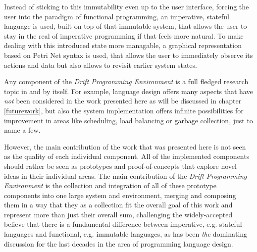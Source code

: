 Instead of sticking to this immutability even up to the user interface,
forcing the user into the paradigm of functional programming, an
imperative, stateful language is used, built on top of that immutable
system, that allows the user to stay in the real of imperative
programming if that feels more natural. To make dealing with this
introduced state more managable, a graphical representation based
on Petri Net syntax is used, that allows the user to immediately
observe its actions and data but also allows to revisit earlier
system states.
\newline

Any component of the \textit{Drift Programming Environment} is
a full fledged research topic in and by itself. For example,
language design offers many aspects that have \textit{not} been considered
in the work presented here as will be discussed in chapter \ref{futurework},
but also the system implementation offers infinite possibilities
for improvement in areas like scheduling, load balancing or
garbage collection, just to name a few.
\newline

However, the main contribution of the work that was presented here
is not seen as the quality of each individual component. All of
the implemented components should rather be seen as prototypes and
proof-of-concepts that explore novel ideas in their individual
areas. The main contribution of the \textit{Drift Programming Environment}
is the collection and integration of all of these prototype
components into one large system and environment, merging
and composing them in a way that they as a collection fit
the overall goal of this work and represent more than just
their overall sum, challenging the widely-accepted believe
that there is a fundamental difference between imperative,
e.g. stateful languages and functional, e.g. immutable languages,
as has been \textit{the} dominating discussion for the last
decades in the area of programming language design.

